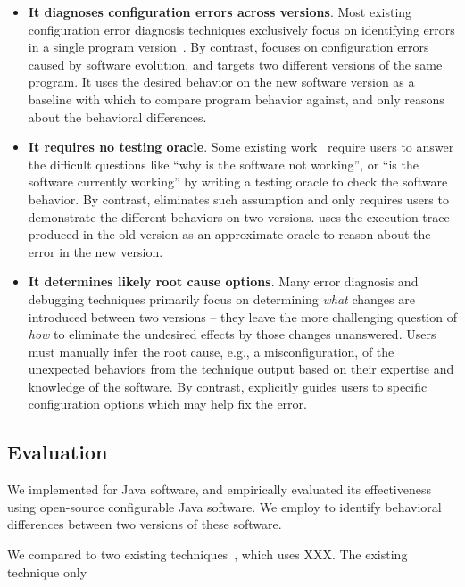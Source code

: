 \begin{itemize}
\item \textbf{It diagnoses configuration errors across versions}.
Most existing configuration error diagnosis techniques
exclusively focus on identifying errors in a single program
version~\cite{}. By contrast, \ourtool focuses on
configuration errors caused by software evolution, and
targets two different versions of the same program. 
It uses the desired behavior on the new software version
as a baseline with which to compare program behavior against, and only
reasons about the behavioral differences.


\item \textbf{It requires no testing oracle}.
Some existing work~\cite{} require users to answer the difficult
questions like ``why is the software not working'', or
``is the software currently working'' by writing a testing
oracle to check the software behavior. By contrast,
\ourtool eliminates such assumption and only requires users to
demonstrate the different behaviors on two versions.
\ourtool uses the execution trace produced in the old
version as an approximate oracle to
reason about the error in the new version.

\item \textbf{It determines likely root cause options}.
Many error diagnosis and debugging techniques primarily focus on
determining \textit{what} changes are introduced between
two versions -- they leave the more challenging
question of \textit{how} to eliminate the undesired effects
by those changes unanswered. Users must manually infer
the root cause, e.g., a misconfiguration,
of the unexpected behaviors from the technique output
based on their expertise and knowledge of the software.
By contrast, \ourtool explicitly guides users to specific
configuration options which may help fix the error.

\end{itemize}

\subsection{Evaluation}

We implemented \ourtool for Java software, and empirically evaluated
its effectiveness using \subjnum open-source configurable Java
software. We employ \ourtool to identify behavioral differences between
two versions of these software.

We compared \ourtool to two existing techniques~\cite{}, which uses XXX.
The existing technique only

